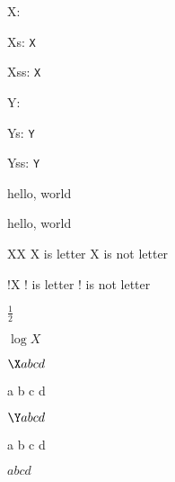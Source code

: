 \documentclass{amsart}
\makeatletter
\def\testcat#1{%
    \expandafter\ifcat \@car #1\@nil X%
        #1 is letter
    \else
        #1 is not letter
    \fi
}
\makeatother
\begin{document}
X: {\tt\meaning\X}

Xs: {\tt\expandafter\meaning\csname X\space\endcsname}

Xss: {\tt\expandafter\meaning\csname X\space\space\endcsname}

Y: {\tt\meaning\Y}

Ys: {\tt\expandafter\meaning\csname Y\space\endcsname}

Yss: {\tt\expandafter\meaning\csname Y\space\space\endcsname}

\makeatletter
\protected@edef\XXXX{\X}
\makeatother

{\tt\meaning\X}

{\tt\meaning\XXXX}

% 
% 

\lowercase{HELLO, WORLD}

hello, world

\testcat{X}

\testcat{!}

$\frac 1 2$

$\log X$

$\X a b c d$

\X a b c d

$\Y a b c d$

\Y a b c d

$\!a b\! c d$
\end{document}
